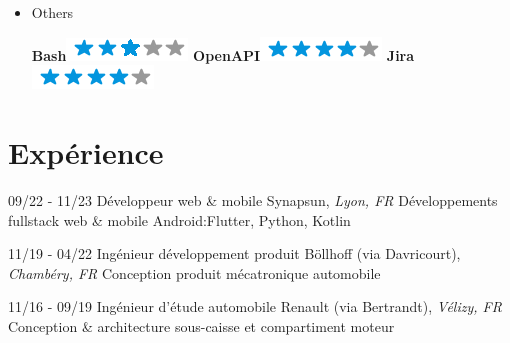 \documentclass[]{friggeri-cv}
\begin{document}
\begin{flushright}
\begin{multicols}{3}
\begin{itemize}
\item Others \
\begin{flushright}

\textbf{Bash}\includegraphics[scale=0.40]{res/img/3stars.png}
\textbf{OpenAPI}\includegraphics[scale=0.40]{res/img/4stars.png}
\textbf{Jira}\includegraphics[scale=0.40]{res/img/4stars.png}
\end{flushright}            


        \end{itemize}
        \end{multicols}
        \end{flushright}
        \vspace*{-0.65cm}
\section{Expérience}
\vspace*{-0.25cm}

\begin{entrylist}
  \entry
    {09/22 - 11/23}
    {Développeur web \& mobile}
    {Synapsun, \textit{Lyon, FR}}
    {Développements fullstack web \& mobile Android:\hspace*{8mm}Flutter, Python, Kotlin}
\end{entrylist}

\begin{entrylist}
  \entry
    {11/19 - 04/22}
    {Ingénieur développement produit}
    {Böllhoff (via Davricourt), \textit{Chambéry, FR}}
    {Conception produit mécatronique automobile}
\end{entrylist}

\begin{entrylist}
  \entry
    {11/16 - 09/19}
    {Ingénieur d'étude automobile}
    {Renault (via Bertrandt), \textit{Vélizy, FR}}
    {Conception \& architecture sous-caisse et compartiment moteur}
\end{entrylist}

\vspace*{-0.5cm}
\vspace*{0.45cm}
\end{document}
